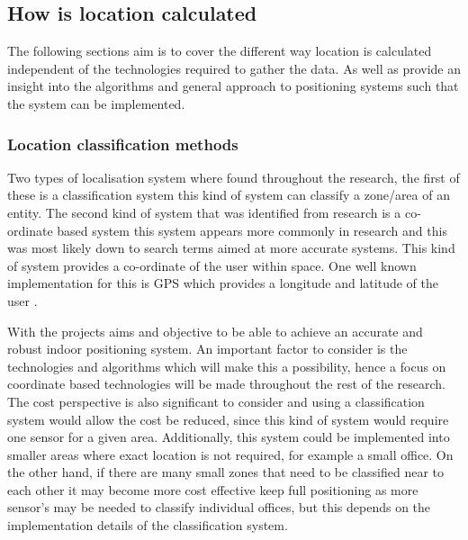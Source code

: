 \subsection{How is location calculated}
The following sections aim is to cover the different way location is calculated independent of the technologies required to gather the data. As well as provide an insight into the algorithms and general approach to positioning systems such that the system can be implemented. 

\subsubsection{Location classification methods}
Two types of localisation system where found throughout the research, the first of these is a classification system this kind of system can classify a zone/area of an entity.
The second kind of system that was identified from research is a co-ordinate based system this system appears more commonly in research and this was most likely down to search terms aimed at more accurate systems. This kind of system provides a co-ordinate of the user within space. One well known implementation for this is GPS which provides a longitude and latitude of the user \cite{kyes_2017_what}.

With the projects aims and objective to be able to achieve an accurate and robust indoor positioning system. An important factor to consider is the technologies and algorithms which will make this a possibility, hence a focus on coordinate based technologies will be made throughout the rest of the research. The cost perspective is also significant to consider and using a classification system would allow the cost be reduced, since this kind of system would require one sensor for a given area. Additionally, this system could be implemented into smaller areas where exact location is not required, for example a small office. On the other hand, if there are many small zones that need to be classified near to each other it may become more cost effective keep full positioning as more sensor's may be needed to classify individual offices, but this depends on the implementation details of the classification system.  

